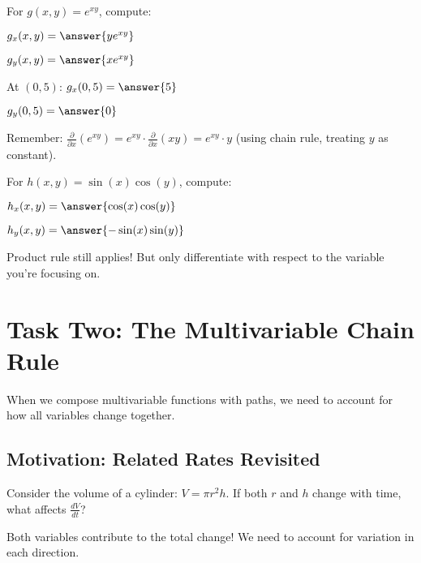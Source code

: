 \documentclass{ximera}
\begin{document}
\begin{problem}
For $g(x, y) = e^{xy}$, compute:

$g_x(x, y) = \answer{ye^{xy}}$

$g_y(x, y) = \answer{xe^{xy}}$

At $(0, 5)$:
$g_x(0, 5) = \answer{5}$

$g_y(0, 5) = \answer{0}$

\begin{feedback}
Remember: $\frac{\partial}{\partial x}(e^{xy}) = e^{xy} \cdot \frac{\partial}{\partial x}(xy) = e^{xy} \cdot y$ (using chain rule, treating $y$ as constant).
\end{feedback}
\end{problem}

\begin{problem}
For $h(x, y) = \sin(x)\cos(y)$, compute:

$h_x(x, y) = \answer{\cos(x)\cos(y)}$

$h_y(x, y) = \answer{-\sin(x)\sin(y)}$

\begin{feedback}
Product rule still applies! But only differentiate with respect to the variable you're focusing on.
\end{feedback}
\end{problem}

\section*{Task Two: The Multivariable Chain Rule}

When we compose multivariable functions with paths, we need to account for how all variables change together.

\subsection*{Motivation: Related Rates Revisited}

\begin{problem}
Consider the volume of a cylinder: $V = \pi r^2 h$. If both $r$ and $h$ change with time, what affects $\frac{dV}{dt}$?

\begin{selectAll}
\end{selectAll}

\begin{feedback}
Both variables contribute to the total change! We need to account for variation in each direction.
\end{feedback}
\end{problem}
\end{document}
